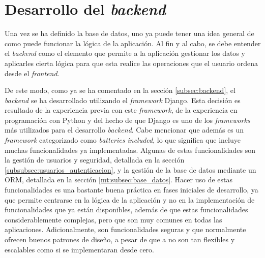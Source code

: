 \section{Desarrollo del \textit{backend}}
\label{dev:sec:desarrollo_backend}

Una vez se ha definido la base de datos, uno ya puede tener una idea general de como puede funcionar la lógica de la aplicación. Al fin y al cabo, se debe entender el \textit{backend} como el elemento que permite a la aplicación gestionar los datos y aplicarles cierta lógica para que esta realice las operaciones que el usuario ordena desde el \textit{frontend}.

De este modo, como ya se ha comentado en la sección \ref{subsec:backend}, el \textit{backend} se ha desarrollado utilizando el \textit{framework} Django. Esta decisión es resultado de la experiencia previa con este \textit{framework}, de la experiencia en programación con Python y del hecho de que Django es uno de los \textit{frameworks} más utilizados para el desarrollo \textit{backend}. Cabe mencionar que además es un \textit{framework} categorizado como \textit{batteries included}, lo que significa que incluye muchas funcionalidades ya implementadas. Algunas de estas funcionalidades son la gestión de usuarios y seguridad, detallada en la sección \ref{subsubsec:usuarios_autenticacion}, y la gestión de la base de datos mediante un ORM, detallada en la sección \ref{mt:subsec:base_datos}. Hacer uso de estas funcionalidades es una bastante buena práctica en fases iniciales de desarrollo, ya que permite centrarse en la lógica de la aplicación y no en la implementación de funcionalidades que ya están disponibles, además de que estas funcionalidades considerablemente complejas, pero que son muy comunes en todas las aplicaciones. Adicionalmente, son funcionalidades seguras y que normalmente ofrecen buenos patrones de diseño, a pesar de que a no son tan flexibles y escalables como si se implementaran desde cero.

